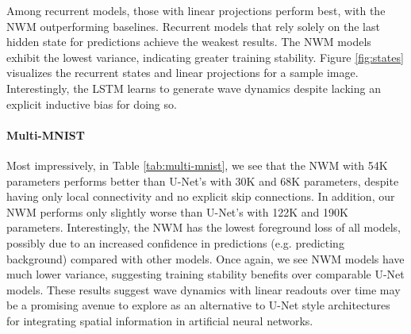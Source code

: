 Among recurrent models, those with linear projections perform best, with the NWM outperforming baselines. Recurrent models that rely solely on the last hidden state for predictions achieve the weakest results. The NWM models exhibit the lowest variance, indicating greater training stability. Figure \ref{fig:states} visualizes the recurrent states and linear projections for a sample image. Interestingly, the LSTM learns to generate wave dynamics despite lacking an explicit inductive bias for doing so.

\vspace{-3mm}
\paragraph{Multi-MNIST}
Most impressively, in Table \ref{tab:multi-mnist}, we see that the NWM with 54K parameters performs better than U-Net's with 30K and 68K parameters, despite having only local connectivity and no explicit skip connections. In addition, our NWM performs only slightly worse than U-Net's with 122K and 190K parameters. Interestingly, the NWM has the lowest foreground loss of all models, possibly due to an increased confidence in predictions (e.g. predicting background) compared with other models. Once again, we see NWM models have much lower variance, suggesting training stability benefits over comparable U-Net models. These results suggest wave dynamics with linear readouts over time may be a promising avenue to explore as an alternative to U-Net style architectures for integrating spatial information in artificial neural networks.






